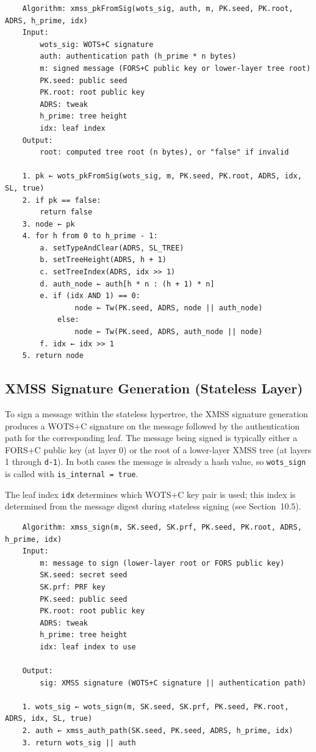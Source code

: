 \begin{verbatim}
    Algorithm: xmss_pkFromSig(wots_sig, auth, m, PK.seed, PK.root, ADRS, h_prime, idx)
    Input:
        wots_sig: WOTS+C signature
        auth: authentication path (h_prime * n bytes)
        m: signed message (FORS+C public key or lower-layer tree root)
        PK.seed: public seed
        PK.root: root public key
        ADRS: tweak
        h_prime: tree height
        idx: leaf index
    Output:
        root: computed tree root (n bytes), or "false" if invalid

    1. pk ← wots_pkFromSig(wots_sig, m, PK.seed, PK.root, ADRS, idx, SL, true)
    2. if pk == false:
        return false
    3. node ← pk
    4. for h from 0 to h_prime - 1:
        a. setTypeAndClear(ADRS, SL_TREE)
        b. setTreeHeight(ADRS, h + 1)
        c. setTreeIndex(ADRS, idx >> 1)
        d. auth_node ← auth[h * n : (h + 1) * n]
        e. if (idx AND 1) == 0:
                node ← Tw(PK.seed, ADRS, node || auth_node)
            else:
                node ← Tw(PK.seed, ADRS, auth_node || node)
        f. idx ← idx >> 1
    5. return node
\end{verbatim}

\subsection{XMSS Signature Generation (Stateless Layer)}
To sign a message within the stateless hypertree, the XMSS signature generation produces a WOTS+C signature on the message followed by the authentication path for the corresponding leaf. The message being signed is typically either a FORS+C public key (at layer 0) or the root of a lower-layer XMSS tree (at layers 1 through \texttt{d-1}). In both cases the message is already a hash value, so \texttt{wots\_sign} is called with \texttt{is\_internal = true}.

The leaf index \texttt{idx} determines which WOTS+C key pair is used; this index is determined from the message digest during stateless signing (see Section~10.5).

\begin{verbatim}
    Algorithm: xmss_sign(m, SK.seed, SK.prf, PK.seed, PK.root, ADRS, h_prime, idx)
    Input:
        m: message to sign (lower-layer root or FORS public key)
        SK.seed: secret seed
        SK.prf: PRF key
        PK.seed: public seed
        PK.root: root public key
        ADRS: tweak
        h_prime: tree height
        idx: leaf index to use

    Output:
        sig: XMSS signature (WOTS+C signature || authentication path)

    1. wots_sig ← wots_sign(m, SK.seed, SK.prf, PK.seed, PK.root, ADRS, idx, SL, true)
    2. auth ← xmss_auth_path(SK.seed, PK.seed, ADRS, h_prime, idx)
    3. return wots_sig || auth
\end{verbatim}

